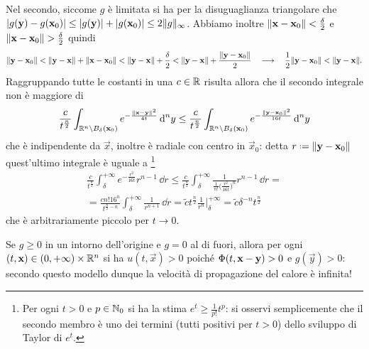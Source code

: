 Nel secondo, siccome $g$ è limitata si ha per la disuguaglianza triangolare che $\lvert g(\mathbf{y})-g(\mathbf{x}_0)\rvert\le\lvert g(\mathbf{y})\rvert+\lvert g(\mathbf{x}_0)\rvert\le 2\lVert g\rVert_\infty$.
Abbiamo inoltre $\lVert\mathbf{x}-\mathbf{x}_0\rVert<\frac{\delta}2$ e $\lVert\mathbf{x}-\mathbf{x}_0\rVert>\frac{\delta}2$ quindi
\begin{equation}
    \lVert\mathbf{y}-\mathbf{x}_0\rVert<
    \lVert\mathbf{y}-\mathbf{x}\rVert+\lVert\mathbf{x}-\mathbf{x}_0\rVert<
    \lVert\mathbf{y}-\mathbf{x}\rVert+\frac{\delta}2<
    \lVert\mathbf{y}-\mathbf{x}\rVert+\frac{\lVert\mathbf{y}-\mathbf{x}_0\rVert}2
    \quad\longrightarrow\quad
    \frac12\lVert\mathbf{y}-\mathbf{x}_0\rVert<\lVert\mathbf{y}-\mathbf{x}\rVert.
\end{equation}
Raggruppando tutte le costanti in una $c\in\mathbb{R}$ risulta allora che il secondo integrale non è maggiore di
\begin{equation}
    \frac{c}{t^\frac{n}2}\int_{\mathbb{R}^n\setminus B_\delta(\mathbf{x}_0)}e^{-\frac{\lVert\mathbf{x}-\mathbf{y}\rVert^2}{4t}}\,\textup{d}^ny\le
    \frac{c}{t^\frac{n}2}\int_{\mathbb{R}^n\setminus B_\delta(\mathbf{x}_0)}e^{-\frac{\lVert\mathbf{y}-\mathbf{x}_0\rVert^2}{16t}}\,\textup{d}^ny
\end{equation}
che è indipendente da $\vec x$, inoltre è radiale con centro in $\vec x_0$: detta $r\defeq\norm{\vec y-\vec x_0}$ quest'ultimo integrale è uguale a
\footnote{
    Per ogni $t>0$ e $p\in\mathbb{N}_0$ si ha la stima $e^t\ge\frac1{p!}t^p$: si osservi semplicemente che il secondo membro è uno dei termini (tutti positivi per $t>0$) dello sviluppo di Taylor di $e^t$.
}
\begin{multline}
    \frac{c}{t^\frac{n}2}\int_\delta^{+\infty}e^{-\frac{r^2}{16t}}r^{n-1}\,\dd r\le
    \frac{c}{t^\frac{n}2}\int_\delta^{+\infty}\frac1{\frac1{n!}\bigl(\frac{r^2}{16t}\bigr)^n}r^{n-1}\,\dd r=\\=
    \frac{cn!16^n}{t^{\frac{n}2-n}}\int_\delta^{+\infty}\frac1{r^{n+1}}\,\dd r=
    \tilde{c}t^\frac{n}2\frac1{r^n}\bigg|_\delta^{+\infty}=
    \tilde{c}\delta^{-n}t^\frac{n}2
\end{multline}
che è arbitrariamente piccolo per $t\to 0$.
\begin{osservazione} \label{o:propagazione-calore-velocita-infinita}
    Se $g\ge 0$ in un intorno dell'origine e $g=0$ al di fuori, allora per ogni $(t,\mathbf{x})\in(0,+\infty)\times\mathbb{R}^n$ si ha $u(t,\vec x)>0$ poich\'e $\Phi(t,\mathbf{x}-\mathbf{y})>0$ e $g(\vec y)>0$: secondo questo modello dunque la velocità di propagazione del calore è infinita!
\end{osservazione}
